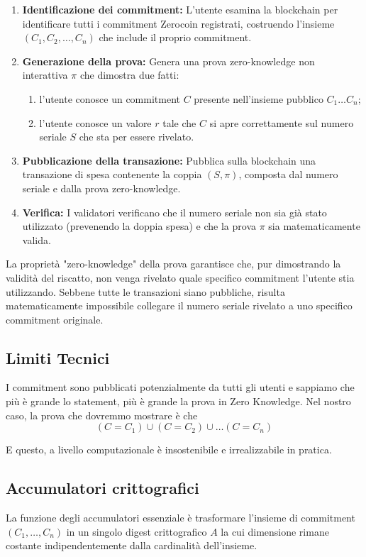 \begin{enumerate}
    \item \textbf{Identificazione dei commitment:} L'utente esamina la blockchain per identificare tutti i commitment Zerocoin registrati, costruendo l'insieme $(C_1, C_2, \dots, C_n)$ che include il proprio commitment.
    \item \textbf{Generazione della prova:} Genera una prova zero-knowledge non interattiva $\pi$ che dimostra due fatti: 
    \begin{enumerate}
        \item l'utente conosce un commitment $C$ presente nell'insieme pubblico $C_1 \dots C_n$;
        \item l'utente conosce un valore $r$ tale che $C$ si apre correttamente sul numero seriale $S$ che sta per essere rivelato.
    \end{enumerate}
    \item \textbf{Pubblicazione della transazione:} Pubblica sulla blockchain una transazione di spesa contenente la coppia $(S, \pi)$, composta dal numero seriale e dalla prova zero-knowledge.
    \item \textbf{Verifica:} I validatori verificano che il numero seriale non sia già stato utilizzato (prevenendo la doppia spesa) e che la prova $\pi$ sia matematicamente valida.
\end{enumerate}
La proprietà "zero-knowledge" della prova garantisce che, pur dimostrando la validità del riscatto, non venga rivelato quale specifico commitment l'utente stia utilizzando. Sebbene tutte le transazioni siano pubbliche, risulta matematicamente impossibile collegare il numero seriale rivelato a uno specifico commitment originale.

\subsection{Limiti Tecnici}
I commitment sono pubblicati potenzialmente da tutti gli utenti e sappiamo che più è grande lo statement, più è grande la prova in Zero Knowledge. Nel nostro caso, la prova che dovremmo mostrare è che
\[(C=C_1) \cup (C=C_2) \cup \dots (C = C_n)\]

E questo, a livello computazionale è insostenibile e irrealizzabile in pratica.

\subsection{Accumulatori crittografici}
La funzione degli accumulatori essenziale è trasformare l'insieme di commitment $(C_1, \dots, C_n)$ in un singolo digest crittografico $A$ la cui dimensione rimane costante indipendentemente dalla cardinalità dell'insieme.

